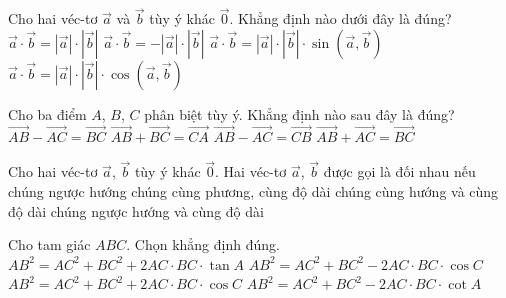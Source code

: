 \begin{ex}%
	Cho hai véc-tơ $\overrightarrow{a}$ và $\overrightarrow{b}$ tùy ý khác $\overrightarrow{0}$. Khẳng định nào dưới đây là đúng?
	\choice
	{$\overrightarrow{a} \cdot \overrightarrow{b}=\left| \overrightarrow{a} \right | \cdot \left| \overrightarrow{b} \right |$}
	{$\overrightarrow{a} \cdot \overrightarrow{b}=- \left| \overrightarrow{a} \right |\cdot \left | \overrightarrow{b} \right |$}
	{$\overrightarrow{a} \cdot \overrightarrow{b}=\left| \overrightarrow{a} \right | \cdot \left| \overrightarrow{b} \right | \cdot \sin \left(\overrightarrow{a}, \overrightarrow{b} \right)$}
	{\True $\overrightarrow{a} \cdot \overrightarrow{b}=\left| \overrightarrow{a} \right | \cdot \left| \overrightarrow{b} \right | \cdot \cos \left(\overrightarrow{a}, \overrightarrow{b} \right)$}
\end{ex}
\begin{ex}%
	Cho ba điểm $A$, $B$, $C$ phân biệt tùy ý. Khẳng định nào sau đây là đúng?
	\choice
	{$\overrightarrow{AB}-\overrightarrow{AC}=\overrightarrow{BC}$}
	{$\overrightarrow{AB} +\overrightarrow{BC}=\overrightarrow{CA}$}
	{\True $\overrightarrow{AB}-\overrightarrow{AC}=\overrightarrow{CB}$}
	{$\overrightarrow{AB} + \overrightarrow{AC}=\overrightarrow{BC}$}
\end{ex}

\begin{ex}%
	Cho hai véc-tơ $\overrightarrow{a}$, $\overrightarrow{b}$ tùy ý khác $\overrightarrow{0}$. Hai véc-tơ $\overrightarrow{a}$, $\overrightarrow{b}$ được gọi là đối nhau nếu
	\choice
	{chúng ngược hướng}
	{chúng cùng phương, cùng độ dài}
	{chúng cùng hướng và cùng độ dài}
	{\True chúng ngược hướng và cùng độ dài}
\end{ex}
\begin{ex}%
	Cho tam giác $ABC$. Chọn khẳng định đúng.
	\choice
	{$AB^2=AC^2+BC^2+2AC\cdot BC \cdot \tan A$}
	{\True $AB^2=AC^2+BC^2-2AC\cdot BC \cdot \cos C$}
	{$AB^2=AC^2+BC^2+2AC\cdot BC \cdot \cos C$}
	{$AB^2=AC^2+BC^2-2AC\cdot BC \cdot \cot A$}
\end{ex}

